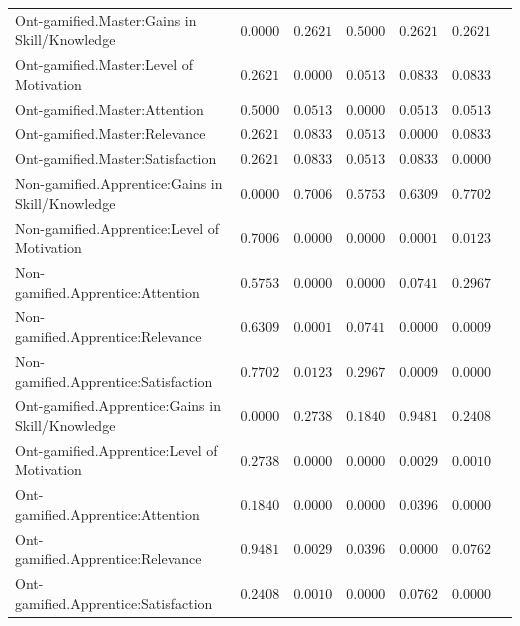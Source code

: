 \begin{landscape}
{\begin{longtable}{lrrrrrr}
Ont-gamified.Master:Gains in Skill/Knowledge&$0.0000$&$0.2621$&$0.5000$&$0.2621$&$0.2621$\tabularnewline
Ont-gamified.Master:Level of Motivation&$0.2621$&$0.0000$&$0.0513$&$0.0833$&$0.0833$\tabularnewline
Ont-gamified.Master:Attention&$0.5000$&$0.0513$&$0.0000$&$0.0513$&$0.0513$\tabularnewline
Ont-gamified.Master:Relevance&$0.2621$&$0.0833$&$0.0513$&$0.0000$&$0.0833$\tabularnewline
Ont-gamified.Master:Satisfaction&$0.2621$&$0.0833$&$0.0513$&$0.0833$&$0.0000$\tabularnewline
\hline

Non-gamified.Apprentice:Gains in Skill/Knowledge&$0.0000$&$0.7006$&$0.5753$&$0.6309$&$0.7702$\tabularnewline
Non-gamified.Apprentice:Level of Motivation&$0.7006$&$0.0000$&$0.0000$&$0.0001$&$0.0123$\tabularnewline
Non-gamified.Apprentice:Attention&$0.5753$&$0.0000$&$0.0000$&$0.0741$&$0.2967$\tabularnewline
Non-gamified.Apprentice:Relevance&$0.6309$&$0.0001$&$0.0741$&$0.0000$&$0.0009$\tabularnewline
Non-gamified.Apprentice:Satisfaction&$0.7702$&$0.0123$&$0.2967$&$0.0009$&$0.0000$\tabularnewline
\hline


Ont-gamified.Apprentice:Gains in Skill/Knowledge&$0.0000$&$0.2738$&$0.1840$&$0.9481$&$0.2408$\tabularnewline
Ont-gamified.Apprentice:Level of Motivation&$0.2738$&$0.0000$&$0.0000$&$0.0029$&$0.0010$\tabularnewline
Ont-gamified.Apprentice:Attention&$0.1840$&$0.0000$&$0.0000$&$0.0396$&$0.0000$\tabularnewline
Ont-gamified.Apprentice:Relevance&$0.9481$&$0.0029$&$0.0396$&$0.0000$&$0.0762$\tabularnewline
Ont-gamified.Apprentice:Satisfaction&$0.2408$&$0.0010$&$0.0000$&$0.0762$&$0.0000$\tabularnewline
\hline

\end{longtable}}\end{landscape}





